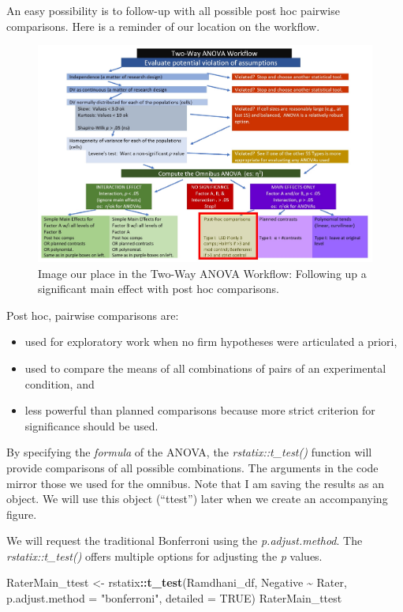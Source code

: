 \documentclass[
  11pt,
]{book}
\newenvironment{Shaded}{\begin{snugshade}}{\end{snugshade}}
\newcommand{\AttributeTok}[1]{\textcolor[rgb]{0.27,0.27,0.27}{#1}}
\newcommand{\ConstantTok}[1]{\textcolor[rgb]{0.37,0.37,0.37}{#1}}
\newcommand{\FunctionTok}[1]{\textcolor[rgb]{0.27,0.27,0.27}{\textbf{#1}}}
\newcommand{\NormalTok}[1]{#1}
\newcommand{\OtherTok}[1]{\textcolor[rgb]{0.37,0.37,0.37}{#1}}
\newcommand{\SpecialCharTok}[1]{\textcolor[rgb]{0.43,0.43,0.43}{\textbf{#1}}}
\newcommand{\StringTok}[1]{\textcolor[rgb]{0.5,0.5,0.5}{#1}}
\providecommand{\tightlist}{%
  \setlength{\itemsep}{0pt}\setlength{\parskip}{0pt}}
\begin{document}
An easy possibility is to follow-up with all possible post hoc pairwise comparisons. Here is a reminder of our location on the workflow.

\begin{figure}
\centering
\includegraphics{images/factorial/wfMain_PH.jpg}
\caption{Image our place in the Two-Way ANOVA Workflow: Following up a significant main effect with post hoc comparisons.}
\end{figure}

Post hoc, pairwise comparisons are:

\begin{itemize}
\tightlist
\item
  used for exploratory work when no firm hypotheses were articulated a priori,
\item
  used to compare the means of all combinations of pairs of an experimental condition, and
\item
  less powerful than planned comparisons because more strict criterion for significance should be used.
\end{itemize}

By specifying the \emph{formula} of the ANOVA, the \emph{rstatix::t\_test()} function will provide comparisons of all possible combinations. The arguments in the code mirror those we used for the omnibus. Note that I am saving the results as an object. We will use this object (``ttest'') later when we create an accompanying figure.

We will request the traditional Bonferroni using the \emph{p.adjust.method}. The \emph{rstatix::t\_test()} offers multiple options for adjusting the \emph{p} values.

\begin{Shaded}
\begin{Highlighting}[]
\NormalTok{RaterMain\_ttest }\OtherTok{\textless{}{-}}\NormalTok{ rstatix}\SpecialCharTok{::}\FunctionTok{t\_test}\NormalTok{(Ramdhani\_df, Negative }\SpecialCharTok{\textasciitilde{}}\NormalTok{ Rater, }\AttributeTok{p.adjust.method =} \StringTok{"bonferroni"}\NormalTok{,}
    \AttributeTok{detailed =} \ConstantTok{TRUE}\NormalTok{)}
\NormalTok{RaterMain\_ttest}
\end{Highlighting}
\end{Shaded}
\end{document}
